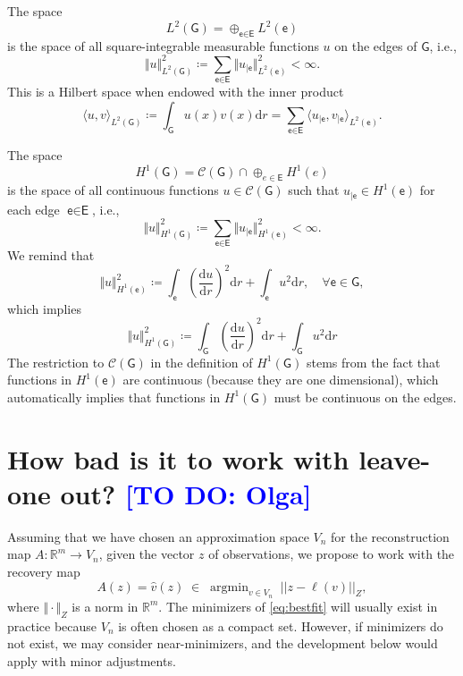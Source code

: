 \documentclass[11pt,a4paper,twoside]{article}
\theoremstyle{definition}
\numberwithin{equation}{section}
\newcommand{\cC}{\ensuremath{\mathcal{C}}}
\newcommand{\bR}{\ensuremath{\mathbb{R}}}
\newcommand{\G}{\ensuremath{\textsf{G}}} %
\newcommand{\E}{\ensuremath{\textsf{E}}} %
\newcommand{\ee}{\ensuremath{\textsf{e}}}
\newcommand{\<}{\langle}
\renewcommand{\>}{\rangle}
\newcommand{\argmin}{\operatorname{argmin}}
\newcommand{\dd}{\ensuremath{\mathrm d}}
\newcommand{\dr}{\ensuremath{\mathrm dr}}
\newcommand{\om}[1]{\textcolor{blue}{#1}}
\begin{document}
The space
$$
L^2(\G) = \oplus_{\ee\in \E} L^2(\ee)
$$
is the space of all square-integrable measurable functions $u$ on the edges of $\G$, i.e.,
\begin{equation}
      \Vert u \Vert^2_{L^2(\G)} \coloneqq \sum_{\ee\in \E} \Vert u_{|\ee} \Vert^2_{L^2(\ee)} <\infty.
\end{equation}
This is a Hilbert space when endowed with the inner product
$$
\<u, v \>_{L^2(\G)}
\coloneqq \int_\G u(x)v(x)\dr
=\sum_{\ee\in \E} \< u_{|\ee} , v_{|\ee}\>_{L^2(\ee)}.
$$

The space 
$$
H^1(\G) =  \cC(\G)\cap\oplus_{e\in \E} H^1(e)
$$
is the space of all continuous functions $u\in \cC(\G)$ such that $u_{|\ee} \in H^1(\ee)$ for each edge $\ee\in \E$, i.e.,
\begin{equation}
      \Vert u \Vert^2_{H^1(\G)} \coloneqq \sum_{\ee\in \E} \Vert u_{|\ee} \Vert^2_{H^1(\ee)} <\infty.
\end{equation}
We remind that
$$
\Vert u \Vert^2_{H^1(\ee)} \coloneqq \int_\ee \left( \frac{\dd u}{\dr} \right)^2 \dr + \int_\ee u^2\dr,\quad \forall \ee \in \G,
$$
which implies
$$
\Vert u \Vert^2_{H^1(\G)} \coloneqq \int_\G \left( \frac{\dd u}{\dr} \right)^2 \dr + \int_\G u^2\dr
$$
The restriction to $\cC(\G)$ in the definition of $H^1(\G)$ stems from the fact that functions in $H^1(\ee)$ are continuous (because they are one dimensional), which automatically implies that functions in $H^1(\G)$ must be continuous on the edges.


\appendix
\section{How bad is it to work with leave-one out? \om{[TO DO: Olga]}}
Assuming that we have chosen an approximation space $V_n$ for the reconstruction map $A:\bR^m \to V_n$, given the vector $z$ of observations, we propose to work with the recovery map
\begin{equation}
\label{eq:bestfit}
A(z) = \hat v(z) \;\in\; \argmin_{v \in V_n} \; || z - \ell(v) ||_Z ,
\end{equation}
where $\Vert \cdot \Vert_Z$ is a norm in $\bR^m$. The minimizers of \eqref{eq:bestfit} will usually exist in practice because $V_n$ is often chosen as a compact set. However, if minimizers do not exist, we may consider near-minimizers, and the development below would apply with minor adjustments.
\end{document}
